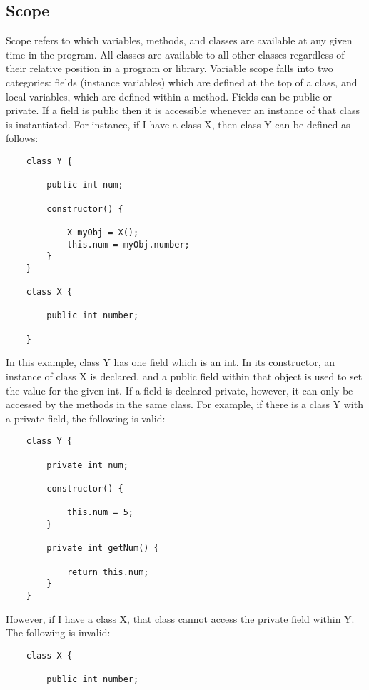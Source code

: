 \begin{homeworkProblem}
	
	\section{Scope}
		
		
	Scope refers to which variables, methods, and classes are available at any given time in the program. All classes are available to all other classes regardless of their relative position in a program or library. Variable scope falls into two categories: fields (instance variables) which are defined at the top of a class, and local variables, which are defined within a method. Fields can be public or private. If a field is public then it is accessible whenever an instance of that class is instantiated. For instance, if I have a class X, then class Y can be defined as follows:
	
	\begin{verbatim}
	class Y {
		
		public int num;
		
		constructor() {
			
			X myObj = X();
			this.num = myObj.number;
		}
	}
	
	class X {
		
		public int number;
		
	}
	\end{verbatim}
	
	In this example, class Y has one field which is an int. In its constructor, an instance of class X is declared, and a public field within that object is used to set the value for the given int. If a field is declared private, however, it can only be accessed by the methods in the same class. For example, if there is a class Y with a private field, the following is valid:
	
	\begin{verbatim}
	class Y {
		
		private int num;
		
		constructor() {
			
			this.num = 5;
		}
		
		private int getNum() {
			
			return this.num;
		}
	}
	\end{verbatim}
		
		However, if I have a class X, that class cannot access the private field within Y. The following is invalid:
	\begin{verbatim}
	class X {
	
		public int number;
	

\end{verbatim}
\end{homeworkProblem}
